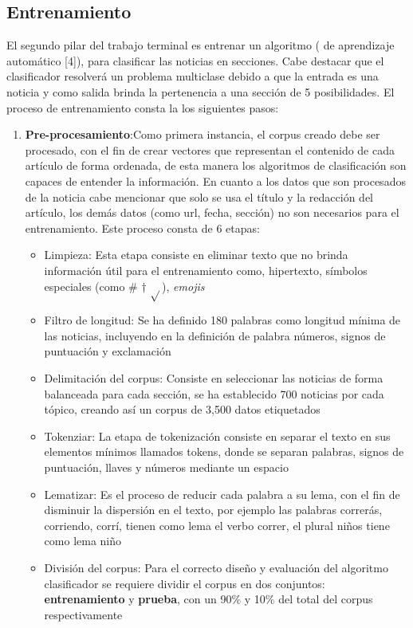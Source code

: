 \subsection{Entrenamiento}

El segundo pilar del trabajo terminal es entrenar un algoritmo ( de aprendizaje automático [4]), para clasificar las noticias en secciones. Cabe destacar que el clasificador resolverá un problema multiclase debido a que la entrada es una noticia y como salida brinda la pertenencia a una sección de 5 posibilidades. El proceso de entrenamiento consta la los siguientes pasos:\\

\begin{enumerate}
  \item \textbf{Pre-procesamiento}:Como primera instancia, el corpus creado debe ser procesado, con el fin de crear vectores que representan el contenido de cada artículo de forma ordenada, de esta manera los algoritmos de clasificación son capaces de entender la información. En cuanto a los datos que son procesados de la noticia cabe mencionar que solo se usa el título y la redacción del artículo, los demás datos (como url, fecha, sección) no son necesarios para el entrenamiento. Este proceso consta de 6 etapas: \\

  \begin{itemize}
    \item Limpieza: Esta etapa consiste en eliminar texto que no brinda información útil para el entrenamiento como, hipertexto, símbolos especiales (como \# $\dagger$ $\sqrt{ }$), \textit{emojis}
    \item Filtro de longitud: Se ha definido 180 palabras como longitud mínima de las noticias, incluyendo en la definición de palabra números, signos de puntuación y exclamación
    \item Delimitación del corpus: Consiste en seleccionar las noticias de forma balanceada para cada sección, se ha establecido 700 noticias por cada tópico, creando así un corpus de 3,500 datos etiquetados
    \item Tokenziar: La etapa de tokenización consiste en separar el texto en sus elementos mínimos llamados tokens, donde se separan palabras, signos de puntuación, llaves y números mediante un espacio
    \item Lematizar: Es el proceso de reducir cada palabra a su lema, con el fin de disminuir la dispersión en el texto, por ejemplo las palabras correrás, corriendo, corrí, tienen como lema el verbo correr, el plural niños tiene como lema niño
    \item División del corpus: Para el correcto diseño y evaluación del algoritmo clasificador se requiere dividir el corpus en dos conjuntos: \textbf{entrenamiento} y \textbf{prueba}, con un 90\% y 10\% del total del corpus respectivamente\\
  \end{itemize}


\end{enumerate}
